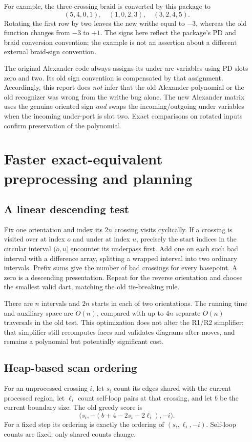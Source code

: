 \documentclass[11pt]{article}
\theoremstyle{remark}\newtheorem{remark}[theorem]{Remark}
\newcommand{\code}[1]{\texttt{\detokenize{#1}}}
\begin{document}
For example, the three-crossing braid \code{[1,1,1]} is converted by this
package to
\[
 (5,4,0,1),\quad(1,0,2,3),\quad(3,2,4,5).
\]
Rotating the first row by two leaves the new writhe equal to $-3$, whereas the
old function changes from $-3$ to $+1$. The signs here reflect the package's PD
and braid conversion convention; the example is not an assertion about a
different external braid-sign convention.

The original Alexander code always assigns its under-arc variables using PD
slots zero and two. Its old sign convention is compensated by that assignment.
Accordingly, this report does \emph{not} infer that the old Alexander polynomial
or the old recognizer was wrong from the writhe bug alone. The new Alexander
matrix uses the genuine oriented sign \emph{and} swaps the incoming/outgoing
under variables when the incoming under-port is slot two. Exact comparisons
on rotated inputs confirm preservation of the polynomial.

\section{Faster exact-equivalent preprocessing and planning}
\subsection{A linear descending test}
Fix one orientation and index its $2n$ crossing visits cyclically. If a crossing
is visited over at index $o$ and under at index $u$, precisely the start indices
in the circular interval $(o,u]$ encounter its underpass first. Add one on each
such bad interval with a difference array, splitting a wrapped interval into
two ordinary intervals. Prefix sums give the number of bad crossings for every
basepoint. A zero is a descending presentation. Repeat for the reverse
orientation and choose the smallest valid dart, matching the old tie-breaking
rule.

There are $n$ intervals and $2n$ starts in each of two orientations. The running
time and auxiliary space are $O(n)$, compared with up to $4n$ separate
$O(n)$ traversals in the old test. This optimization does not alter the R1/R2
simplifier; that simplifier still recomputes faces and validates diagrams after
moves, and remains a polynomial but potentially significant cost.

\subsection{Heap-based scan ordering}
For an unprocessed crossing $i$, let $s_i$ count its edges shared with the
current processed region, let $\ell_i$ count self-loop pairs at that crossing,
and let $b$ be the current boundary size. The old greedy score is
\[
 \bigl(s_i,-(b+4-2s_i-2\ell_i),-i\bigr).
\]
For a fixed step its ordering is exactly the ordering of
$(s_i,\ell_i,-i)$. Self-loop counts are fixed; only shared counts change.
\end{document}
